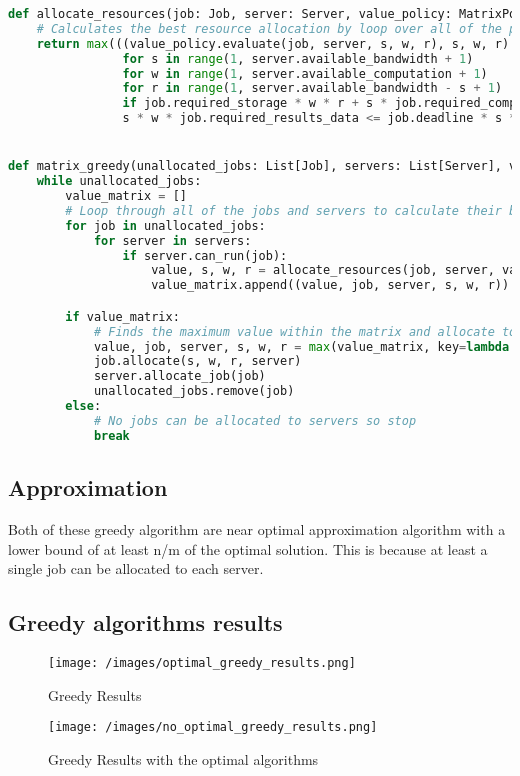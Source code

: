 \begin{lstlisting}[language=Python]
def allocate_resources(job: Job, server: Server, value_policy: MatrixPolicy):
    # Calculates the best resource allocation by loop over all of the possible allocations that satisfy the deadline constraint
    return max(((value_policy.evaluate(job, server, s, w, r), s, w, r)
                for s in range(1, server.available_bandwidth + 1)
                for w in range(1, server.available_computation + 1)
                for r in range(1, server.available_bandwidth - s + 1)
                if job.required_storage * w * r + s * job.required_computation * r +
                s * w * job.required_results_data <= job.deadline * s * w * r), key=lambda x: x[0])


def matrix_greedy(unallocated_jobs: List[Job], servers: List[Server], value_policy: MatrixPolicy):
    while unallocated_jobs:
        value_matrix = []
        # Loop through all of the jobs and servers to calculate their best resource allocation
        for job in unallocated_jobs:
            for server in servers:
                if server.can_run(job):
                    value, s, w, r = allocate_resources(job, server, value_policy)
                    value_matrix.append((value, job, server, s, w, r))

        if value_matrix:
            # Finds the maximum value within the matrix and allocate to job and server
            value, job, server, s, w, r = max(value_matrix, key=lambda x: x[0])
            job.allocate(s, w, r, server)
            server.allocate_job(job)
            unallocated_jobs.remove(job)
        else:
            # No jobs can be allocated to servers so stop
            break
\end{lstlisting}

\subsection{Approximation}\label{subsec:approximation}
Both of these greedy algorithm are near optimal approximation algorithm with a lower bound of at least n/m of the
optimal solution. This is because at least a single job can be allocated to each server.

\subsection{Greedy algorithms results}\label{subsec:greedy-algorithms-results}
\begin{figure}
\centering
    \texttt{[image: /images/optimal\_greedy\_results.png]}
    \caption{Greedy Results}
\end{figure}

\begin{figure}
\centering
    \texttt{[image: /images/no\_optimal\_greedy\_results.png]}
    \caption{Greedy Results with the optimal algorithms}
\end{figure}
